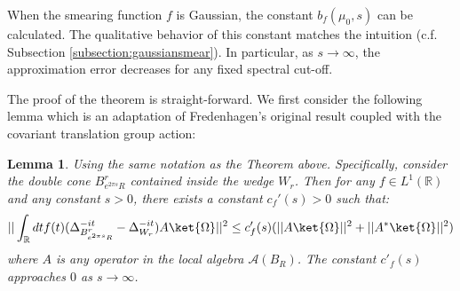 \documentclass[a4paper,11pt]{article}
\newtheorem{lemma}[theorem]{Lemma}
\theoremstyle{definition}
\theoremstyle{remark}
\begin{document}
When the smearing function $f$ is Gaussian, the constant $b_f(\mu_0, s)$ can be calculated. The qualitative behavior of this constant matches the intuition (c.f. Subsection \ref{subsection:gaussiansmear}). In particular, as $s\rightarrow\infty$, the approximation error decreases for any fixed spectral cut-off. 

The proof of the theorem is straight-forward. We first consider the following lemma which is an adaptation of Fredenhagen's original result \cite{fredenhagen} coupled with the covariant translation group action:
\begin{lemma}\label{lemma:extensionfredenhagen}
    Using the same notation as the Theorem above. Specifically, consider the double cone $B^r_{e^{2\pi s}R}$ contained inside the wedge $W_r$. Then for any $f\in L^1(\mathbb{R})$ and any constant $s > 0$, there exists a constant $c_f'(s) > 0$ such that:
    \begin{equation}
        ||\int_\mathbb{R} dt f(t) (\Delta^{-it}_{B^r_{e^{2\pi s}R}} - \Delta_{W_r}^{-it})A\ket{\Omega}||^2 \leq c'_f(s)(||A\ket{\Omega}||^2 + ||A^*\ket{\Omega}||^2)
    \end{equation}
    where $A$ is any operator in the local algebra $\mathcal{A}(B_R)$. The constant $c'_f(s)$ approaches $0$ as $s\rightarrow \infty$.
\end{lemma}
\end{document}
